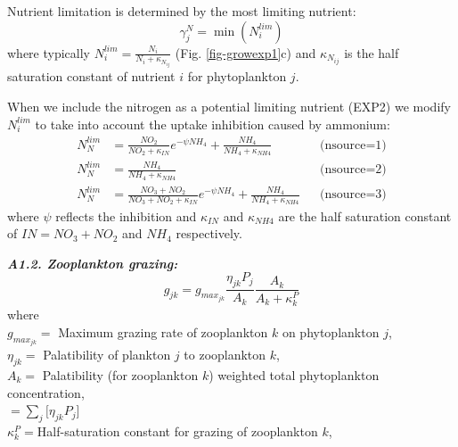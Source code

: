 \documentclass[11pt,letterpaper,english]{article}
\begin{document}
Nutrient limitation is determined by the most limiting nutrient:
\[
\gamma_j^N = \min(N_i^{lim})
\]
where typically
$N_i^{lim}=\frac{N_i}{N_i+\kappa_{N_{ij}}}$
(Fig. \ref{fig-growexp1}c) and $\kappa_{N_{ij}}$ is the half saturation constant of nutrient $i$ for phytoplankton $j$.

When we include the nitrogen as a potential limiting nutrient (EXP2) we 
modify $N_i^{lim}$ to take into account the uptake inhibition caused by ammonium:
\begin{align*}
N_N^{lim} &= \frac{NO_2}{NO_2+\kappa_{IN}} e^{-\psi NH_4}
+\frac{NH_4}{NH_4 + \kappa_{NH4}}  && \text{(nsource=1)} \\
N_N^{lim} &= \frac{NH_4}{NH_4 + \kappa_{NH4}}  && \text{(nsource=2)} \\
N_N^{lim} &= \frac{NO_3 + NO_2}{NO_3+NO_2+\kappa_{IN}} e^{-\psi NH_4}
+\frac{NH_4}{NH_4 + \kappa_{NH4}}  && \text{(nsource=3)}
\end{align*}
where $\psi$ reflects the inhibition and $\kappa_{IN}$ and $ \kappa_{NH4}$
are the half saturation constant of $IN=NO_3+NO_2$ and $NH_4$ respectively.

\vspace{.2cm}

{\it {\bf A1.2. Zooplankton grazing:}}\\
\[
 g_{jk} =g_{max_{jk}} \frac{\eta_{jk} P_j}{A_k} \frac{A_k}{A_k+\kappa^P_k}
\]
where\\
\mbox{} \hspace{.5cm} $g_{max_{jk}}=$ Maximum grazing rate of zooplankton $k$ on
phytoplankton $j$,\\
\mbox{} \hspace{.5cm} $\eta_{jk}=$ Palatibility of plankton $j$ to zooplankton $k$,\\
\mbox{} \hspace{.5cm} $A_k=$ Palatibility (for zooplankton $k$) weighted total phytoplankton concentration,\\
\mbox{} \hspace{1.1cm} $=\sum_j [\eta_{jk} P_j$] \\
\mbox{} \hspace{.5cm} $\kappa^P_k=$Half-saturation constant for grazing of zooplankton $k$,\\


\vspace{.2cm}
\end{document}
